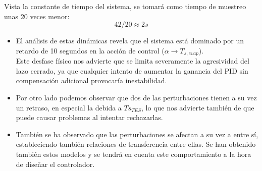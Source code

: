	Vista la constante de tiempo del sistema, se tomará como tiempo de muestreo unas 20 veces menor: 
	$$42/20 \approx 2 s$$
	\begin{itemize}
	\item El análisis de estas dinámicas revela que el sistema está dominado por un retardo de 10 segundos en la acción de control ($\alpha \to T_{s,evap}$). \\
	Este desfase físico nos advierte que se limita severamente la agresividad del lazo cerrado, ya que cualquier intento de aumentar la ganancia del PID sin compensación adicional provocaría inestabilidad. 
	\item Por otro lado podemos observar que dos de las perturbaciones tienen a su vez un retraso, en especial la debida a $Ts_{TES}$, lo que nos advierte también de que puede causar problemas al intentar rechazarlas. 
\item También se ha observado que las perturbaciones se afectan a su vez a entre sí, estableciendo también relaciones de transferencia entre ellas. Se han obtenido también estos modelos y se tendrá en cuenta este comportamiento a la hora de diseñar el controlador. \\
	\end{itemize}
